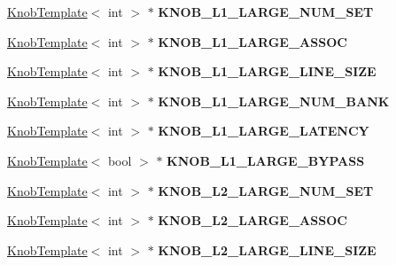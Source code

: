 \begin{DoxyCompactItemize}
\item 
\hypertarget{classall__knobs__c_aefd743bb6591ba8c5330836e4d8d3d8b}{
\hyperlink{classKnobTemplate}{KnobTemplate}$<$ int $>$ $\ast$ {\bfseries KNOB\_\-L1\_\-LARGE\_\-NUM\_\-SET}}
\label{classall__knobs__c_aefd743bb6591ba8c5330836e4d8d3d8b}

\item 
\hypertarget{classall__knobs__c_a1ea944fb8b8b4eac7327fc31f8770e19}{
\hyperlink{classKnobTemplate}{KnobTemplate}$<$ int $>$ $\ast$ {\bfseries KNOB\_\-L1\_\-LARGE\_\-ASSOC}}
\label{classall__knobs__c_a1ea944fb8b8b4eac7327fc31f8770e19}

\item 
\hypertarget{classall__knobs__c_a51c13132426ad24399d724926ed0488a}{
\hyperlink{classKnobTemplate}{KnobTemplate}$<$ int $>$ $\ast$ {\bfseries KNOB\_\-L1\_\-LARGE\_\-LINE\_\-SIZE}}
\label{classall__knobs__c_a51c13132426ad24399d724926ed0488a}

\item 
\hypertarget{classall__knobs__c_a499570ed3c2dd5eb40c8e343d9564501}{
\hyperlink{classKnobTemplate}{KnobTemplate}$<$ int $>$ $\ast$ {\bfseries KNOB\_\-L1\_\-LARGE\_\-NUM\_\-BANK}}
\label{classall__knobs__c_a499570ed3c2dd5eb40c8e343d9564501}

\item 
\hypertarget{classall__knobs__c_a5fcef5125592c62ebf9013032bf66b4e}{
\hyperlink{classKnobTemplate}{KnobTemplate}$<$ int $>$ $\ast$ {\bfseries KNOB\_\-L1\_\-LARGE\_\-LATENCY}}
\label{classall__knobs__c_a5fcef5125592c62ebf9013032bf66b4e}

\item 
\hypertarget{classall__knobs__c_aa2dcd6835412f2edf3d17177b6092aa3}{
\hyperlink{classKnobTemplate}{KnobTemplate}$<$ bool $>$ $\ast$ {\bfseries KNOB\_\-L1\_\-LARGE\_\-BYPASS}}
\label{classall__knobs__c_aa2dcd6835412f2edf3d17177b6092aa3}

\item 
\hypertarget{classall__knobs__c_ae3517e7d8f7afe92d7460991502f2450}{
\hyperlink{classKnobTemplate}{KnobTemplate}$<$ int $>$ $\ast$ {\bfseries KNOB\_\-L2\_\-LARGE\_\-NUM\_\-SET}}
\label{classall__knobs__c_ae3517e7d8f7afe92d7460991502f2450}

\item 
\hypertarget{classall__knobs__c_aa334135329105eeb66cf6b077a03a461}{
\hyperlink{classKnobTemplate}{KnobTemplate}$<$ int $>$ $\ast$ {\bfseries KNOB\_\-L2\_\-LARGE\_\-ASSOC}}
\label{classall__knobs__c_aa334135329105eeb66cf6b077a03a461}

\item 
\hypertarget{classall__knobs__c_a9c18bff004b0d37c7a76c18a7b3f3db1}{
\hyperlink{classKnobTemplate}{KnobTemplate}$<$ int $>$ $\ast$ {\bfseries KNOB\_\-L2\_\-LARGE\_\-LINE\_\-SIZE}}
\label{classall__knobs__c_a9c18bff004b0d37c7a76c18a7b3f3db1}


\end{DoxyCompactItemize}
